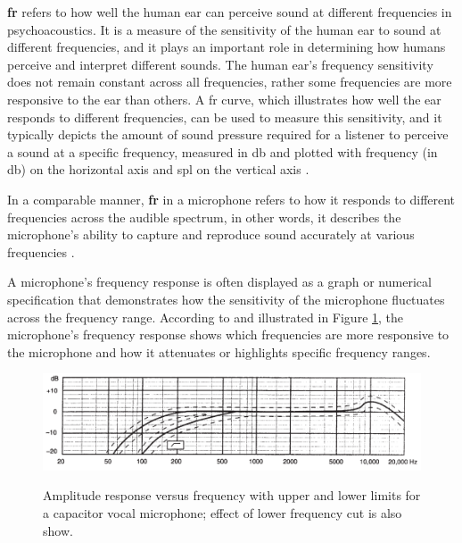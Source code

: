 \textbf{\gls{fr}} refers to how well the human ear can perceive sound at different frequencies in psychoacoustics. It is a measure of the sensitivity of the human ear to sound at different frequencies, and it plays an important role in determining how humans perceive and interpret different sounds. The human ear's frequency sensitivity does not remain constant across all frequencies, rather some frequencies are more responsive to the ear than others. A \gls{fr} curve, which illustrates how well the ear responds to different frequencies, can be used to measure this sensitivity, and it typically depicts the amount of sound pressure required for a listener to perceive a sound at a specific frequency, measured in \gls{db} and plotted with frequency (in \gls{db}) on the horizontal axis and \gls{spl} on the vertical axis \cite{Moore2013}.

In a comparable manner, \textbf{\gls{fr}} in a microphone refers to how it responds to different frequencies across the audible spectrum, in other words, it describes the microphone's ability to capture and reproduce sound accurately at various frequencies \cite{Rayburn2004}.

A microphone's frequency response is often displayed as a graph or numerical specification that demonstrates how the sensitivity of the microphone fluctuates across the frequency range. According to \textcite{Rayburn2004} and illustrated in Figure \ref{fig:frmwk_microphone_frequency_response}, the microphone's frequency response shows which frequencies are more responsive to the microphone and how it attenuates or highlights specific frequency ranges.

\begin{figure}[htbp]
    \raggedright
        \caption{Amplitude response versus frequency with upper and lower limits for a capacitor vocal microphone; effect of lower frequency cut is also show.}
        \includegraphics[width=1\textwidth]{resources/images/030-theoretical_framework/Framework_microphone_frequency_response.png}
        \label{fig:frmwk_microphone_frequency_response}
\end{figure}

